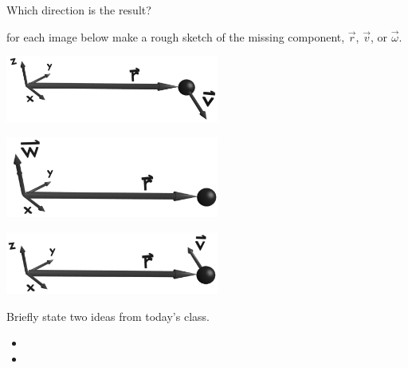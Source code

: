 \begin{problem}
\begin{subproblem}
    \vfill
  \item Which direction is the result?
    \vfill
  \end{subproblem}
\clearpage
\item for each image below make a rough sketch of the missing
  component, $\vec{r}$, $\vec{v}$, or $\vec{\omega}$.
  \begin{subproblem}
  \item \includegraphics[width=7cm]{blender/week12/negativeZOmega}
  \item \includegraphics[width=7cm]{blender/week12/findOmega}
  \item \includegraphics[width=7cm]{blender/week12/positiveZOmega}
  \end{subproblem}
\end{problem}

\postClass

\begin{problem}
\item Briefly state two ideas from today's class.
  \begin{itemize}
  \item 
  \item 
  \end{itemize}
\item 
  \begin{subproblem}
    \item
  \end{subproblem}
\end{problem}




